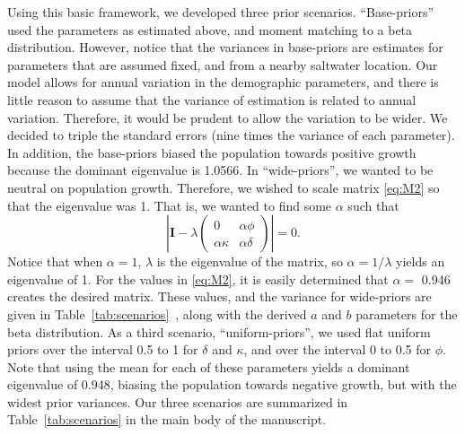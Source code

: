 \documentclass[]{risa}\usepackage[]{graphicx}\usepackage[]{color}
\def\bI{\mathbf{I}}
\begin{document}
Using this basic framework, we developed three prior scenarios.  ``Base-priors'' used the parameters as estimated above, and moment matching to a beta distribution.  However, notice that the variances in base-priors are estimates for parameters that are assumed fixed, and from a nearby saltwater location.  Our model allows for annual variation in the demographic parameters, and there is little reason to assume that the variance of estimation is related to annual variation. Therefore, it would be prudent to allow the variation to be wider.  We decided to triple the standard errors (nine times the variance of each parameter).  In addition, the base-priors biased the population towards positive growth because the dominant eigenvalue is 1.0566.  In ``wide-priors'', we wanted to be neutral on population growth. Therefore, we wished to scale matrix \ref{eq:M2} so that the eigenvalue was 1.  That is, we wanted to find some $\alpha$ such that
\[
  \left| \bI -
  \lambda\left( \begin{array}{ll}
      0 & \alpha\phi \\
      \alpha\kappa & \alpha\delta
  \end{array} \right) \right| = 0.
\]
Notice that when $\alpha = 1$, $\lambda$ is the eigenvalue of the matrix, so $\alpha = 1/\lambda$ yields an eigenvalue of 1. For the values in \ref{eq:M2}, it is easily determined that $\alpha =$ 0.946 creates the desired matrix. These values, and the variance for wide-priors are given in Table~\ref{tab:scenarios}~, along with the derived $a$ and $b$ parameters for the beta distribution.  As a third scenario, ``uniform-priors'', we used flat uniform priors over the interval 0.5 to 1 for $\delta$ and $\kappa$, and over the interval 0 to 0.5 for $\phi$.  Note that using the mean for each of these parameters yields a dominant eigenvalue of 0.948, biasing the population towards negative growth, but with the widest prior variances.  Our three scenarios are summarized in Table~\ref{tab:scenarios} in the main body of the manuscript.
\end{document}
